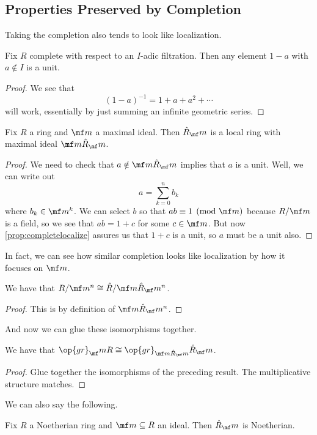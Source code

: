 \subsection{Properties Preserved by Completion}
Taking the completion also tends to look like localization.
\begin{proposition} \label{prop:completelocalize}
	Fix $R$ complete with respect to an $I$-adic filtration. Then any element $1-a$ with $a\notin I$ is a unit.
\end{proposition}
\begin{proof}
	We see that
	\[(1-a)^{-1}=1+a+a^2+\cdots\]
	will work, essentially by just summing an infinite geometric series.
\end{proof}
\begin{corollary}
	Fix $R$ a ring and $\mf m$ a maximal ideal. Then $\hat R_\mf m$ is a local ring with maximal ideal $\mf m\hat R_\mf m$.
\end{corollary}
\begin{proof}
	We need to check that $a\notin\mf m\hat R_\mf m$ implies that $a$ is a unit. Well, we can write out
	\[a=\sum_{k=0}^nb_k\]
	where $b_k\in\mf m^k$. We can select $b$ so that $ab\equiv1\pmod{\mf m}$ because $R/\mf m$ is a field, so we see that $ab=1+c$ for some $c\in\mf m$. But now \autoref{prop:completelocalize} assures us that $1+c$ is a unit, so $a$ must be a unit also.
\end{proof}
In fact, we can see how similar completion looks like localization by how it focuses on $\mf m$.
\begin{lemma}
	We have that $R/\mf m^n\cong\hat R/\mf m\hat R_\mf m^n$.
\end{lemma}
\begin{proof}
	This is by definition of $\mf m\hat R_\mf m^n$.
\end{proof}
And now we can glue these isomorphisms together.
\begin{corollary}
	We have that $\op{gr}_\mf mR\cong\op{gr}_{\mf m\hat R_\mf m}\hat R_\mf m$.
\end{corollary}
\begin{proof}
	Glue together the isomorphisms of the preceding result. The multiplicative structure matches.
\end{proof}
We can also say the following.
\begin{theorem}
	Fix $R$ a Noetherian ring and $\mf m\subseteq R$ an ideal. Then $\hat R_\mf m$ is Noetherian.
\end{theorem}
